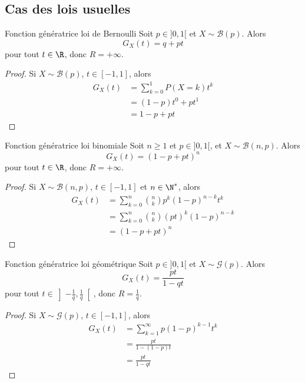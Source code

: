 \subsection{Cas des lois usuelles }

\begin{proposition}{Fonction génératrice loi de Bernoulli}{}
    Soit $p \in ]0, 1[$ et $X \sim \mathcal B(p)$. Alors 
    $$ G_X(t) = q + p t $$
    pour tout $t \in \R$, donc $R = + \infty$.
\end{proposition}

\begin{proof}
    Si $X \sim \mathcal B(p)$, $t \in [-1, 1]$, alors
    \begin{align}
        G_X(t) & = \sum_{k = 0}^1 P(X = k) t^k \\
        & = (1 - p) t^0 + p t^1 \\
        & = 1 - p + p t
    \end{align}
\end{proof}

\begin{proposition}{Fonction génératrice loi binomiale}{}
    Soit $n \geqslant 1$ et $p \in ]0, 1[$, et $X \sim \mathcal B(n, p)$. Alors 
    $$ G_X(t) = (1 - p + p t)^n $$
    pour tout $t \in \R$, donc $R = + \infty$.
\end{proposition}

\begin{proof}
    Si $X \sim \mathcal B(n, p)$, $t \in [-1, 1]$ et $n \in \N^*$, alors
    \begin{align}
        G_X(t) & = \sum_{k = 0}^n \binom n k p^k (1 - p)^{n - k} t^k \\
        & = \sum_{k = 0}^n \binom n k (p t)^k (1 - p)^{n - k} \\
        & = (1 - p + p t)^n
    \end{align}
\end{proof}

\begin{proposition}{Fonction génératrice loi géométrique}{}
    Soit $p \in ]0, 1[$ et $X \sim \mathcal G(p)$. Alors 
    $$ G_X(t) = \frac{pt}{1 - q t} $$
    pour tout $t \in \left]-\frac 1 q, \frac 1 q \right[$, donc 
    $R = \frac 1 q $.
\end{proposition}

\begin{proof}
    Si $X \sim \mathcal G(p)$, $t \in [-1, 1]$, alors
    \begin{align}
        G_X(t) & = \sum_{k = 1}^{\infty} p (1 - p)^{k - 1} t^k \\
        & = \frac{pt}{1 - (1 - p) t} \\
        & = \frac{pt}{1 - qt}
    \end{align}
\end{proof}

